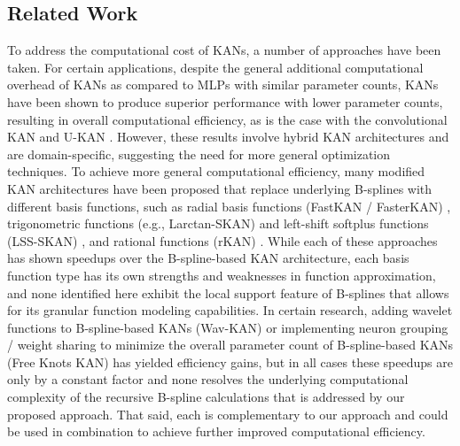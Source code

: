 \subsection{Related Work}

To address the computational cost of KANs, a number of approaches have been taken.  For certain applications, despite the general additional computational overhead of KANs as compared to MLPs with similar parameter counts, KANs have been shown to produce superior performance with lower parameter counts, resulting in overall computational efficiency, as is the case with the convolutional KAN and U-KAN \cite{bodner2024, li2024}.  However, these results involve hybrid KAN architectures and are domain-specific, suggesting the need for more general optimization techniques.  To achieve more general computational efficiency, many modified KAN architectures have been proposed that replace underlying B-splines with different basis functions, such as radial basis functions (FastKAN / FasterKAN) \cite{li2024radial}, trigonometric functions (e.g., Larctan-SKAN) and left-shift softplus functions (LSS-SKAN) \cite{chen2024lss, chen2024larctan}, and rational functions (rKAN) \cite{aghaei2024}.  While each of these approaches has shown speedups over the B-spline-based KAN architecture, each basis function type has its own strengths and weaknesses in function approximation, and none identified here exhibit the local support feature of B-splines that allows for its granular function modeling capabilities. In certain research, adding wavelet functions to B-spline-based KANs (Wav-KAN) \cite{bozorgasl2024} or implementing neuron grouping / weight sharing to minimize the overall parameter count of B-spline-based KANs (Free Knots KAN) \cite{zheng2025} has yielded efficiency gains, but in all cases these speedups are only by a constant factor and none resolves the underlying computational complexity of the recursive B-spline calculations that is addressed by our proposed approach.  That said, each is complementary to our approach and could be used in combination to achieve further improved computational efficiency.